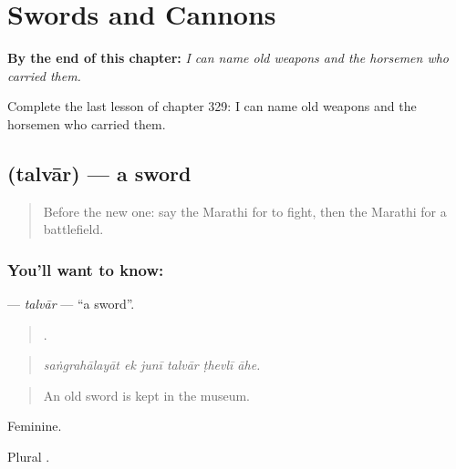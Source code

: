 
\chapter{Swords and Cannons}
\label{ch:mr-swords-and-cannons}

\begin{chapteropening}
\textbf{By the end of this chapter:} \emph{I can name old weapons and the horsemen who carried them.}

Complete the last lesson of chapter 329: I can name old weapons and the horsemen who carried them.
\end{chapteropening}

\section[\texorpdfstring{\mr{तलवार} (talvār)}{तलवार (talvār)}]{ (talvār) — a sword}

\label{lesson:MR-C329-talvar}



\begin{quote}
Before the new one: say the Marathi for to fight, then the Marathi for a battlefield.
\end{quote}

\subsection*{You'll want to know: }
\textbf{} — \emph{talvār} — \textquotedblleft{}a sword\textquotedblright{}.

\begin{quote}
     .
\end{quote}

\begin{quote}
\emph{saṅgrahālayāt ek junī talvār ṭhevlī āhe.}
\end{quote}

\begin{quote}
An old sword is kept in the museum.
\end{quote}

Feminine.

Plural .

